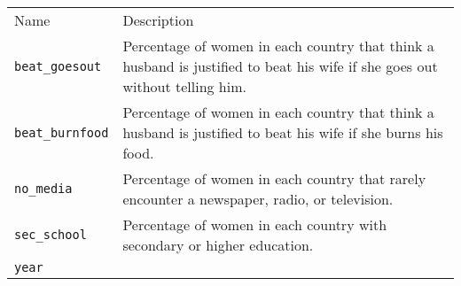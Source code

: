 \documentclass[]{article}
\begin{document}
\begin{longtable}[c]{@{}ll@{}}
\toprule\addlinespace
\begin{minipage}[b]{0.22\columnwidth}\raggedright
Name
\end{minipage} & \begin{minipage}[b]{0.72\columnwidth}\raggedright
Description
\end{minipage}
\\\addlinespace
\midrule\endhead
\begin{minipage}[t]{0.22\columnwidth}\raggedright
\texttt{beat\_goesout}
\end{minipage} & \begin{minipage}[t]{0.72\columnwidth}\raggedright
Percentage of women in each country that think a husband is justified to
beat his wife if she goes out without telling him.
\end{minipage}
\\\addlinespace
\begin{minipage}[t]{0.22\columnwidth}\raggedright
\texttt{beat\_burnfood}
\end{minipage} & \begin{minipage}[t]{0.72\columnwidth}\raggedright
Percentage of women in each country that think a husband is justified to
beat his wife if she burns his food.
\end{minipage}
\\\addlinespace
\begin{minipage}[t]{0.22\columnwidth}\raggedright
\texttt{no\_media}
\end{minipage} & \begin{minipage}[t]{0.72\columnwidth}\raggedright
Percentage of women in each country that rarely encounter a newspaper,
radio, or television.
\end{minipage}
\\\addlinespace
\begin{minipage}[t]{0.22\columnwidth}\raggedright
\texttt{sec\_school}
\end{minipage} & \begin{minipage}[t]{0.72\columnwidth}\raggedright
Percentage of women in each country with secondary or higher education.
\end{minipage}
\\\addlinespace
\begin{minipage}[t]{0.22\columnwidth}\raggedright
\texttt{year}
\end{minipage} & \begin{minipage}[t]{0.72\columnwidth}\raggedright

\end{minipage}
\end{longtable}
\end{document}
